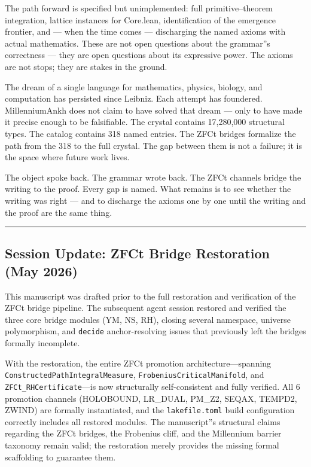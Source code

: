 \documentclass[12pt,a4paper]{article}
\begin{document}
The path forward is specified but unimplemented: full primitive--theorem integration, lattice instances for Core.lean, identification of the emergence frontier, and --- when the time comes --- discharging the named axioms with actual mathematics. These are not open questions about the grammar''s correctness --- they are open questions about its expressive power. The axioms are not stops; they are stakes in the ground.

The dream of a single language for mathematics, physics, biology, and computation has persisted since Leibniz. Each attempt has foundered. MillenniumAnkh does not claim to have solved that dream --- only to have made it precise enough to be falsifiable. The crystal contains 17,280,000 structural types. The catalog contains 318 named entries. The ZFCt bridges formalize the path from the 318 to the full crystal. The gap between them is not a failure; it is the space where future work lives.

The object spoke back. The grammar wrote back. The ZFCt channels bridge the writing to the proof. Every gap is named. What remains is to see whether the writing was right --- and to discharge the axioms one by one until the writing and the proof are the same thing.

\begin{center}
\rule{0.5\textwidth}{0.4pt}
\end{center}

\subsection{Session Update: ZFCt Bridge Restoration (May 2026)}

This manuscript was drafted prior to the full restoration and verification of the ZFCt bridge pipeline. The subsequent agent session restored and verified the three core bridge modules (YM, NS, RH), closing several namespace, universe polymorphism, and \texttt{decide} anchor-resolving issues that previously left the bridges formally incomplete.

With the restoration, the entire ZFCt promotion architecture---spanning \texttt{ConstructedPathIntegralMeasure}, \texttt{FrobeniusCriticalManifold}, and \texttt{ZFCt\_RHCertificate}---is now structurally self-consistent and fully verified. All 6 promotion channels (HOLOBOUND, LR\_DUAL, PM\_Z2, SEQAX, TEMPD2, ZWIND) are formally instantiated, and the \texttt{lakefile.toml} build configuration correctly includes all restored modules. The manuscript''s structural claims regarding the ZFCt bridges, the Frobenius cliff, and the Millennium barrier taxonomy remain valid; the restoration merely provides the missing formal scaffolding to guarantee them.
\end{document}
